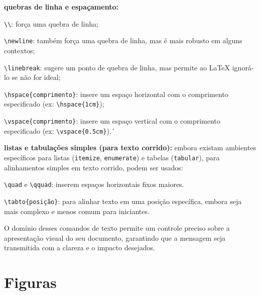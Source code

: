 \begin{alineas}
	\item \textbf{quebras de linha e espaçamento:}
	\begin{alineas}
		\item \verb|\\|: força uma quebra de linha;
		\item \verb|\newline|: também força uma quebra de linha, mas é mais robusto em alguns contextos;
		\item \verb|\linebreak|: sugere um ponto de quebra de linha, mas permite ao LaTeX ignorá-lo se não for ideal;
		\item \verb|\hspace{comprimento}|: insere um espaço horizontal com o comprimento especificado (ex: \verb|\hspace{1cm}|);
		\item \verb|\vspace{comprimento}|: insere um espaço vertical com o comprimento especificado (ex: \verb|\vspace{0.5cm}|).´
	\end{alineas}
	
	\item \textbf{listas e tabulações simples (para texto corrido):} embora existam ambientes específicos para listas (\texttt{itemize}, \texttt{enumerate}) e tabelas (\texttt{tabular}), para alinhamentos simples em texto corrido, podem ser usados:
	\begin{alineas}
		\item \verb|\quad| e \verb|\qquad|: inserem espaços horizontais fixos maiores.
		\item \verb|\tabto{posição}|: para alinhar texto em uma posição específica, embora seja mais complexo e menos comum para iniciantes.
	\end{alineas}
\end{alineas}

O domínio desses comandos de texto permite um controle preciso sobre a apresentação visual do seu documento, garantindo que a mensagem seja transmitida com a clareza e o impacto desejados.





\section{Figuras} \label{sec:latexFiguras}

